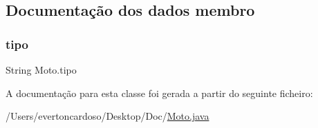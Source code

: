 \subsection{Documentação dos dados membro}
\mbox{\label{class_moto_a98533b801c6277bdac415e9d21f74efe}} 
\subsubsection{\texorpdfstring{tipo}{tipo}}
{\footnotesize\ttfamily String Moto.\+tipo\hspace{0.3cm}{\ttfamily [protected]}}



A documentação para esta classe foi gerada a partir do seguinte ficheiro\+:\begin{DoxyCompactItemize}
\item 
/\+Users/evertoncardoso/\+Desktop/\+Doc/\mbox{\hyperlink{_moto_8java}{Moto.\+java}}\end{DoxyCompactItemize}
